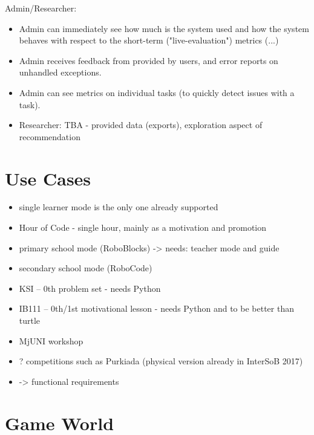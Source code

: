 Admin/Researcher:
\begin{itemize}
\item Admin can immediately see how much is the system used and how the system behaves with respect to the short-term ("live-evaluation") metrics (...)
\item Admin receives feedback from provided by users, and error reports on unhandled exceptions.
\item Admin can see metrics on individual tasks (to quickly detect issues with a task).
\item Researcher: TBA - provided data (exports), exploration aspect of recommendation
\end{itemize}




\section{Use Cases}
\label{sec:robomission.use-cases}

\begin{itemize}
\item single learner mode is the only one already supported
\item Hour of Code  - single hour,  mainly as a motivation and promotion
\item primary school mode (RoboBlocks) -> needs: teacher mode and guide
\item secondary school mode (RoboCode)
\item KSI -- 0th problem set - needs Python
\item IB111 -- 0th/1st motivational lesson - needs Python and to be better than turtle
\item MjUNI workshop
\item ? competitions such as Purkiada (physical version already in InterSoB 2017)
\item -> functional requirements
\end{itemize}




\section{Game World}
\label{sec:robomission.game-world}

